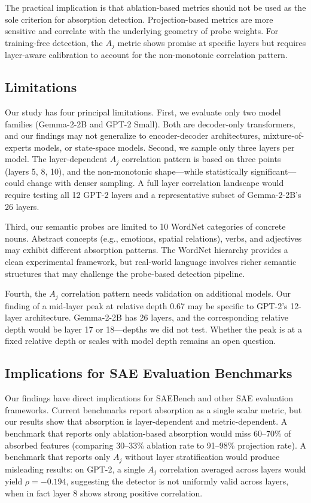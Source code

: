 \documentclass{article}
\begin{document}
The practical implication is that ablation-based metrics should not be used as the sole criterion for absorption detection. Projection-based metrics are more sensitive and correlate with the underlying geometry of probe weights. For training-free detection, the $A_j$ metric shows promise at specific layers but requires layer-aware calibration to account for the non-monotonic correlation pattern.

\subsection{Limitations}

Our study has four principal limitations. First, we evaluate only two model families (Gemma-2-2B and GPT-2 Small). Both are decoder-only transformers, and our findings may not generalize to encoder-decoder architectures, mixture-of-experts models, or state-space models. Second, we sample only three layers per model. The layer-dependent $A_j$ correlation pattern is based on three points (layers 5, 8, 10), and the non-monotonic shape---while statistically significant---could change with denser sampling. A full layer correlation landscape would require testing all 12 GPT-2 layers and a representative subset of Gemma-2-2B's 26 layers.

Third, our semantic probes are limited to 10 WordNet categories of concrete nouns. Abstract concepts (e.g., emotions, spatial relations), verbs, and adjectives may exhibit different absorption patterns. The WordNet hierarchy provides a clean experimental framework, but real-world language involves richer semantic structures that may challenge the probe-based detection pipeline.

Fourth, the $A_j$ correlation pattern needs validation on additional models. Our finding of a mid-layer peak at relative depth 0.67 may be specific to GPT-2's 12-layer architecture. Gemma-2-2B has 26 layers, and the corresponding relative depth would be layer 17 or 18---depths we did not test. Whether the peak is at a fixed relative depth or scales with model depth remains an open question.

\subsection{Implications for SAE Evaluation Benchmarks}

Our findings have direct implications for SAEBench \citep{karvonen2025saebench} and other SAE evaluation frameworks. Current benchmarks report absorption as a single scalar metric, but our results show that absorption is layer-dependent and metric-dependent. A benchmark that reports only ablation-based absorption would miss 60--70\% of absorbed features (comparing 30--33\% ablation rate to 91--98\% projection rate). A benchmark that reports only $A_j$ without layer stratification would produce misleading results: on GPT-2, a single $A_j$ correlation averaged across layers would yield $\rho = -0.194$, suggesting the detector is not uniformly valid across layers, when in fact layer 8 shows strong positive correlation.
\end{document}
